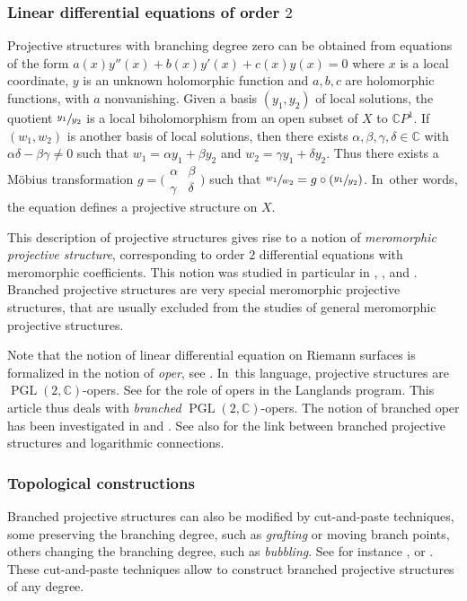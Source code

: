 \documentclass[JEP,XML,SOM,Unicode,NoEqCountersInSection,published]{cedram}
\newcommand{\C}{\mathbb C}
\newcommand{\CP}{\mathbb CP}
\DeclareMathOperator{\PGL}{PGL}
\theoremstyle{definition}
\theoremstyle{plain}
\begin{document}
\subsubsection*{Linear differential equations of order $2$}
Projective structures with branching degree zero can be obtained from equations of the form $a(x)y''(x) + b(x)y'(x) + c(x)y(x) = 0$ where $x$ is a local coordinate, $y$ is an unknown holomorphic function and $a, b, c$ are holomorphic functions, with $a$ nonvanishing.
Given a basis $(y_1, y_2)$ of local solutions, the quotient $\sfrac{y_1}{y_2}$ is a local biholomorphism from an open subset of $X$ to $\CP^1$.
If $(w_1, w_2)$ is another basis of local solutions, then there exists $\alpha, \beta, \gamma, \delta \in \C$ with $\alpha \delta - \beta \gamma \neq 0$ such that $w_1 = \alpha y_1 + \beta y_2$ and $w_2 = \gamma y_1 + \delta y_2$.
Thus there exists a Möbius transformation $g =\bigl(\begin{smallmatrix} \alpha & \beta \\ \gamma & \delta \end{smallmatrix}\bigr)$ such that $\sfrac{w_1}{w_2} = g \circ(\sfrac{y_1}{y_2})$. In~other words, the equation defines a projective structure on $X$.

This description of projective structures gives rise to a notion of \emph{meromorphic projective structure}, corresponding to order $2$ differential equations with meromorphic coefficients.
This notion was studied in particular in \cite{allegretti-bridgeland}, \cite{gupta-mj}, \cite{gupta-mj_2} and \cite{serandour}.
Branched projective structures are very special meromorphic projective structures, that are usually excluded from the studies of general meromorphic projective structures.

Note that the notion of linear differential equation on Riemann surfaces is formalized in the notion of \emph{oper}, see \cite{beilinson-drinfeld}. In~this language, projective structures are $\PGL(2, \C)$-opers. See \cite{frenkel} for the role of opers in the Langlands program.
This article thus deals with \emph{branched} $\PGL(2, \C)$-opers.
The notion of branched oper has been investigated in \cite{frenkel-gaitsgory} and \cite{biswas-dumitrescu-heller}.
See also \cite{biswas-dumitrescu-gupta} for the link between branched projective structures and logarithmic connections.

\subsubsection*{Topological constructions}
Branched projective structures can also be modified by cut-and-paste techniques, some preserving the branching degree, such as \emph{grafting} or {moving branch points}, others changing the branching degree, such as \emph{bubbling}.
See for instance \cite{dumas}, \cite{gallo-kapovich-marden} or \cite{calsamiglia-deroin-francaviglia}.
These cut-and-paste techniques allow to construct branched projective structures of any degree.
\end{document}
